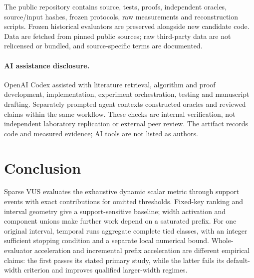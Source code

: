 The public repository contains source, tests, proofs, independent oracles,
source/input hashes, frozen protocols, raw measurements and reconstruction
scripts. Frozen historical evaluators are preserved alongside new candidate
code. Data are fetched from pinned public sources; raw third-party data are
not relicensed or bundled, and source-specific terms are documented.

\paragraph{AI assistance disclosure.}
OpenAI Codex assisted with literature retrieval, algorithm and proof
development, implementation, experiment orchestration, testing and manuscript
drafting. Separately prompted agent contexts constructed oracles and reviewed
claims within the same workflow. These checks are internal verification,
not independent laboratory replication or external peer review. The artifact
records code and measured evidence; AI tools are not listed as authors.

\section{Conclusion}
Sparse VUS evaluates the exhaustive dynamic scalar metric through support
events with exact contributions for omitted thresholds. Fixed-key ranking
and interval geometry give a support-sensitive baseline; width activation
and component unions make further work depend on a saturated prefix.
For one original interval, temporal runs aggregate complete tied classes,
with an integer sufficient stopping condition and a separate local numerical
bound. Whole-evaluator acceleration and incremental prefix acceleration are
different empirical claims: the first passes its stated primary study,
while the latter fails its default-width criterion and improves qualified
larger-width regimes.
